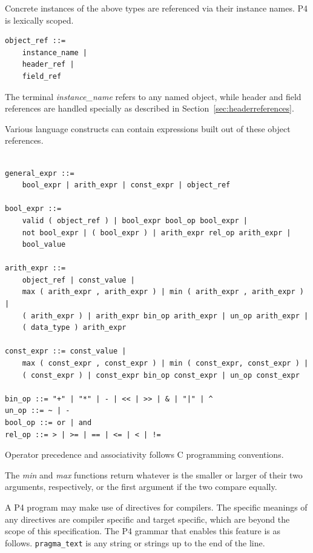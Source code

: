 \documentclass[12pt]{article}
\begin{document}

Concrete instances of the above types are referenced via their instance names.  
P4 is lexically scoped.

\begin{lstlisting}[style=BNFstyle]
object_ref ::=
    instance_name |
    header_ref |
    field_ref
\end{lstlisting}

The terminal \textit{instance_name} refers to any named object, while header 
and field references are handled specially as described in 
Section~\ref{sec:headerreferences}.


Various language constructs can contain expressions built out of these object
references.

\begin{lstlisting}[style=BNFstyle]

general_expr ::= 
    bool_expr | arith_expr | const_expr | object_ref

bool_expr ::=
    valid ( object_ref ) | bool_expr bool_op bool_expr |
    not bool_expr | ( bool_expr ) | arith_expr rel_op arith_expr |
    bool_value

arith_expr ::=
    object_ref | const_value | 
    max ( arith_expr , arith_expr ) | min ( arith_expr , arith_expr ) |
    ( arith_expr ) | arith_expr bin_op arith_expr | un_op arith_expr |
    ( data_type ) arith_expr

const_expr ::= const_value |
    max ( const_expr , const_expr ) | min ( const_expr, const_expr ) |
    ( const_expr ) | const_expr bin_op const_expr | un_op const_expr 

bin_op ::= "+" | "*" | - | << | >> | & | "|" | ^
un_op ::= ~ | -
bool_op ::= or | and
rel_op ::= > | >= | == | <= | < | !=

\end{lstlisting}

Operator precedence and associativity follows C programming conventions.

The \textit{min} and \textit{max} functions return whatever is the smaller or
larger of their two arguments, respectively, or the first argument if the two 
compare equally.


A P4 program may make use of directives for compilers. The specific meanings
of any directives are compiler specific and target specific, which are 
beyond the scope of this specification. The P4 grammar that enables this feature 
is as follows. \texttt{pragma_text} is any string or strings up to the end of the line.
\end{document}
